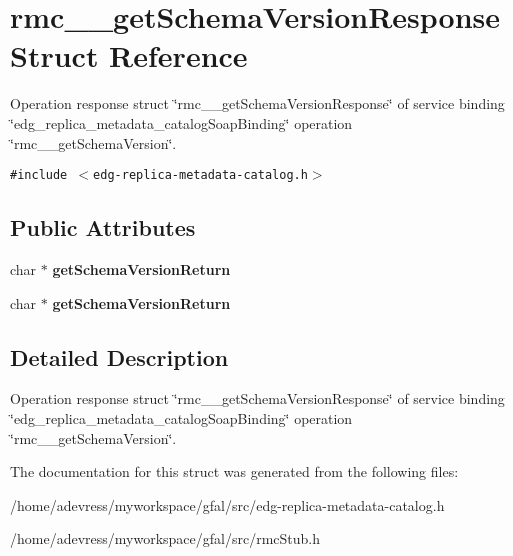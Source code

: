 \section{rmc\_\-\_\-get\-Schema\-Version\-Response Struct Reference}
\label{structrmc____getSchemaVersionResponse}
Operation response struct \char`\"{}rmc\_\-\_\-get\-Schema\-Version\-Response\char`\"{} of service binding \char`\"{}edg\_\-replica\_\-metadata\_\-catalog\-Soap\-Binding\char`\"{} operation \char`\"{}rmc\_\-\_\-get\-Schema\-Version\char`\"{}.  


{\tt \#include $<$edg-replica-metadata-catalog.h$>$}

\subsection*{Public Attributes}
\begin{CompactItemize}
\item 
char $\ast$ \textbf{get\-Schema\-Version\-Return}\label{structrmc____getSchemaVersionResponse_9ba984e17f0b4ead85aaf1871a576962}

\item 
char $\ast$ \textbf{get\-Schema\-Version\-Return}\label{structrmc____getSchemaVersionResponse_9ba984e17f0b4ead85aaf1871a576962}

\end{CompactItemize}


\subsection{Detailed Description}
Operation response struct \char`\"{}rmc\_\-\_\-get\-Schema\-Version\-Response\char`\"{} of service binding \char`\"{}edg\_\-replica\_\-metadata\_\-catalog\-Soap\-Binding\char`\"{} operation \char`\"{}rmc\_\-\_\-get\-Schema\-Version\char`\"{}. 



The documentation for this struct was generated from the following files:\begin{CompactItemize}
\item 
/home/adevress/myworkspace/gfal/src/edg-replica-metadata-catalog.h\item 
/home/adevress/myworkspace/gfal/src/rmc\-Stub.h\end{CompactItemize}
